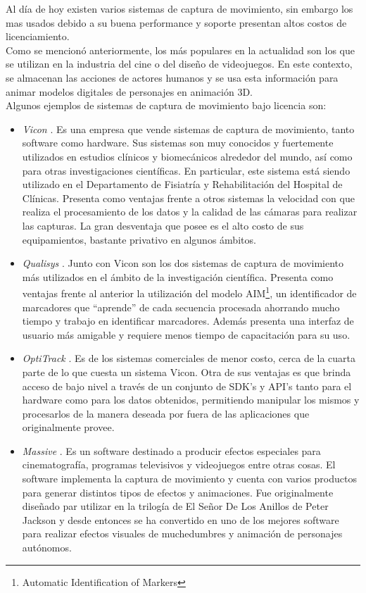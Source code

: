 Al día de hoy existen varios sistemas de captura de movimiento, sin embargo los mas usados debido a su buena performance y soporte presentan altos costos de licenciamiento. 
\\ 

Como se mencionó anteriormente, los más populares en la actualidad son los que se utilizan en la industria del cine o del diseño de videojuegos. En este contexto, se almacenan las acciones de actores humanos y se usa esta información para animar modelos digitales de personajes en animación 3D.
\\ 

Algunos ejemplos de sistemas de captura de movimiento bajo licencia son:

\begin{itemize}
\item \emph{Vicon} \cite{vicon}. Es una empresa que vende sistemas de captura de movimiento, tanto software como hardware. Sus sistemas son muy conocidos y fuertemente utilizados en estudios clínicos y biomecánicos alrededor del mundo, así como para otras investigaciones científicas. En particular, este sistema está siendo utilizado en el Departamento de Fisiatría y Rehabilitación del Hospital de Clínicas. Presenta como ventajas frente a otros sistemas la velocidad con que realiza el procesamiento de los datos y la calidad de las cámaras para realizar las capturas. La gran desventaja que posee es el alto costo de sus equipamientos, bastante privativo en algunos ámbitos.
\item \emph{Qualisys} \cite{qualisys}. Junto con Vicon son los dos sistemas de captura de movimiento más utilizados en el ámbito de la investigación científica. Presenta como ventajas frente al anterior la utilización del modelo AIM\footnote{Automatic Identification of Markers}, un identificador de marcadores que ``aprende'' de cada secuencia procesada ahorrando mucho tiempo y trabajo en identificar marcadores. Además presenta una interfaz de usuario más amigable y requiere menos tiempo de capacitación para su uso.
\item \emph{OptiTrack} \cite{optitrack}. Es de los sistemas comerciales de menor costo, cerca de la cuarta parte de lo que cuesta un sistema Vicon. Otra de sus ventajas es que brinda acceso de bajo nivel a través de un conjunto de  SDK's y API's tanto para el hardware como para los datos obtenidos, permitiendo manipular los mismos y procesarlos de la manera deseada por fuera de las aplicaciones que originalmente provee. 
\item \emph{Massive} \cite{massive}. Es un software destinado a producir efectos especiales para cinematografía, programas televisivos y videojuegos entre otras cosas. El software implementa la captura de movimiento y cuenta con varios productos para generar distintos tipos de efectos y animaciones. Fue originalmente diseñado par utilizar en la trilogía de El Señor De Los Anillos de Peter Jackson y desde entonces se ha convertido en uno de los mejores software para realizar efectos visuales de muchedumbres y animación de personajes autónomos.

\end{itemize}
